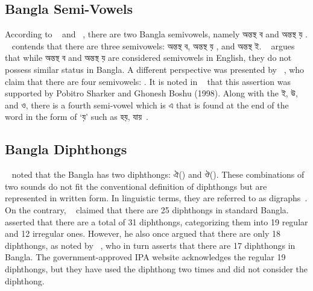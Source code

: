 \subsection{Bangla Semi-Vowels}
According to ~\citet{chatterji1921bengali} and ~\citet{sen1993itibritta}, there are two Bangla semivowels, namely \textbengali{অন্তস্থ ব} and \textbengali{অন্তস্থ য়} . ~\citet{hai1964dhwonibijnan} contends that there are three semivowels: \textbengali{অন্তস্থ ব}, \textbengali{অন্তস্থ য়} , and \textbengali{অন্তস্থ ই}. ~\citet{morshed1997bhashatatwa} argues that while \textbengali{অন্তস্থ ব} and \textbengali{অন্তস্থ য়}  are considered semivowels in English, they do not possess similar status in Bangla. A different perspective was presented by ~\citet{ferguson1960phonemes}, who claim that there are four semivowels: . It is noted in ~\citet{ali2001dhanibijnaner} that this assertion was supported by Pobitro Sharker and Ghonesh Boshu (1998). Along with the \textbengali{ই}, \textbengali{উ}, and \textbengali{ও}, there is a fourth semi-vowel which is \textbengali{এ} that is found at the end of the word in the form of \textbengali{‘য়’} such as \textbengali{হয়}, \textbengali{যায়}~\cite{ali2001dhanibijnaner}.




\subsection{Bangla Diphthongs}
~\citet{sen1993itibritta} noted that the Bangla has two diphthongs: \textbengali{ঐ}() and \textbengali{ঔ}(). These combinations of two sounds do not fit the conventional definition of diphthongs but are represented in written form. In linguistic terms, they are referred to as digraphs~\cite{ali2001dhanibijnaner}. On the contrary, ~\citet{chatterji1921bengali} claimed that there are 25 diphthongs in standard Bangla. ~\citet{hai1964dhwonibijnan} asserted that there are a total of 31 diphthongs, categorizing them into 19 regular and 12 irregular ones. However, he also once argued that there are only 18 diphthongs, as noted by ~\citet{ali2001dhanibijnaner}, who in turn asserts that there are 17 diphthongs in Bangla. The government-approved IPA website acknowledges the regular 19 diphthongs, but they have used the diphthong  two times and did not consider the  diphthong.


